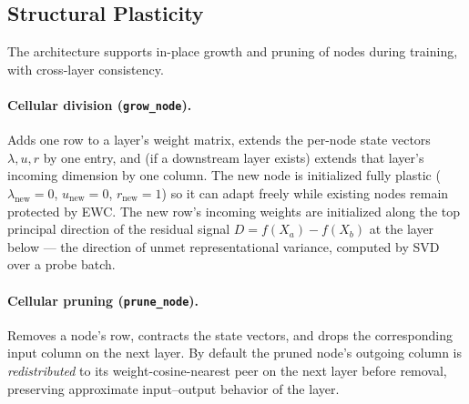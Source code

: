 \documentclass[11pt]{article}
\begin{document}
\subsection{Structural Plasticity}
\label{sec:structural-plasticity}

The architecture supports in-place growth and pruning of nodes during
training, with cross-layer consistency.

\paragraph{Cellular division (\texttt{grow\_node}).}
Adds one row to a layer's weight matrix, extends the per-node state
vectors $\lambda, u, r$ by one entry, and (if a downstream layer exists)
extends that layer's incoming dimension by one column. The new node is
initialized fully plastic ($\lambda_{\text{new}} = 0$,
$u_{\text{new}} = 0$, $r_{\text{new}} = 1$) so it can adapt freely while
existing nodes remain protected by EWC. The new row's incoming weights are
initialized along the top principal direction of the residual signal
$D = f(X_a) - f(X_b)$ at the layer below --- the direction of unmet
representational variance, computed by SVD over a probe batch.

\paragraph{Cellular pruning (\texttt{prune\_node}).}
Removes a node's row, contracts the state vectors, and drops the
corresponding input column on the next layer. By default the pruned node's
outgoing column is \emph{redistributed} to its weight-cosine-nearest peer
on the next layer before removal, preserving approximate input--output
behavior of the layer.
\end{document}
